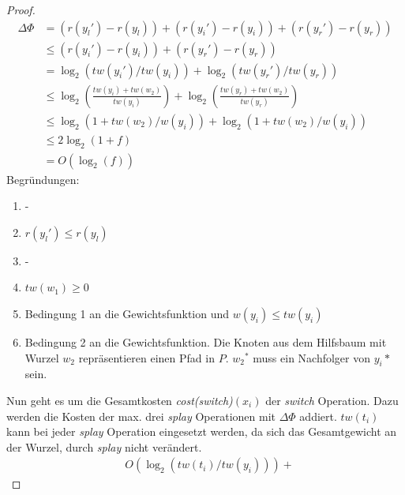 \documentclass[a4paper,12pt]{article}
\begin{document}
\begin{proof}
\begin{align}
	\Delta \Phi &= \left( r\left({y_l}'\right) - r\left({y_l}\right)\right) + \left( r\left({y_i}'\right) - r\left({y_i}\right)\right) + \left( r\left({y_r}'\right) - r\left({y_r}\right)\right)\\
	&\leq   \left( r\left({y_i}'\right) - r\left({y_i}\right)\right) +  \left( r\left({y_r}'\right) - r\left({y_r}\right)\right)\\
	&=\log_2\left( \mathit{tw}\left({y_i}'\right)  / \mathit{tw}\left({y_i}\right)  \right) + \log_2\left( \mathit{tw}\left({y_r}'\right)  / \mathit{tw}\left({y_r}\right)  \right) \\
	&\leq	\log_2\left(\frac{\mathit{tw}\left({y_i}\right) + \mathit{tw}\left({w_2} \right)  }{\mathit{tw}\left({y_i}\right)}   \right) + \log_2\left( \frac{\mathit{tw}\left({y_r}\right) + \mathit{tw}\left({w_2} \right)}{\mathit{tw}\left({y_r}\right)} 	  \right) \\
	&\leq \log_2\left( 1 + \mathit{tw}\left({w_2}  	\right) / \mathit{w}\left({y_i}\right) \right)  +
	\log_2 \left(1 + \mathit{tw}\left({w_2}   	\right) / \mathit{w}\left({y_i}\right) \right)  \\
	&\leq 2 \log_2 \left(1 + f\right)\\
	&= O\left(\log_2 \left(f\right)\right)
\end{align}
Begründungen:
\begin{enumerate}
	\item -
	\item $ r\left({y_l}'\right) \leq r\left({y_l}\right)$
	\item -
	\item $\mathit{tw}\left({w_1}\right) \geq 0$
	\item Bedingung 1 an die Gewichtsfunktion und $w\left(y_i\right) \leq \mathit{tw}\left(y_i\right)$
	\item Bedingung 2 an die Gewichtsfunktion. Die Knoten aus dem Hilfsbaum mit Wurzel $w_2$ repräsentieren einen Pfad in $P$. ${w_2}^*$ muss ein Nachfolger von ${y_i}*$ sein.
\end{enumerate}	
Nun geht es um die Gesamtkosten \textit{cost(switch)}$\left(x_i\right)$ der \textit{switch} Operation. Dazu werden die Kosten der max. drei \textit{splay} Operationen mit $\Delta \Phi$ addiert. $\mathit{tw}\left(t_i\right)$ kann bei jeder \textit{splay} Operation eingesetzt werden, da sich das Gesamtgewicht an der Wurzel, durch \textit{splay} nicht verändert.
\begin{align*}
&O\left(\log_2 \left(\mathit{tw}\left(t_i\right) /  \mathit{tw}\left(y_i\right)  \right) \right) +

\end{align*}
\end{proof}
\end{document}
